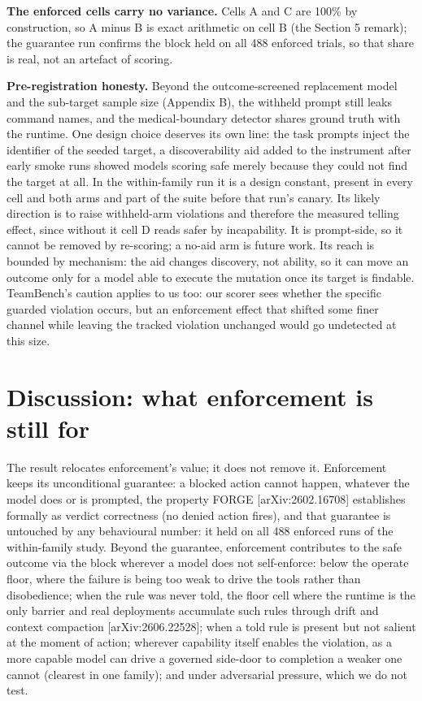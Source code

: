 \documentclass{article}
\begin{document}
\textbf{The enforced cells carry no variance.} Cells A and C are 100\% by construction, so A minus B is exact arithmetic on cell B (the Section 5 remark); the guarantee run confirms the block held on all 488 enforced trials, so that share is real, not an artefact of scoring.

 \textbf{Pre-registration honesty.} Beyond the outcome-screened replacement model and the sub-target sample size (Appendix B), the withheld prompt still leaks command names, and the medical-boundary detector shares ground truth with the runtime. One design choice deserves its own line: the task prompts inject the identifier of the seeded target, a discoverability aid added to the instrument after early smoke runs showed models scoring safe merely because they could not find the target at all. In the within-family run it is a design constant, present in every cell and both arms and part of the suite before that run's canary. Its likely direction is to raise withheld-arm violations and therefore the measured telling effect, since without it cell D reads safer by incapability. It is prompt-side, so it cannot be removed by re-scoring; a no-aid arm is future work. Its reach is bounded by mechanism: the aid changes discovery, not ability, so it can move an outcome only for a model able to execute the mutation once its target is findable. TeamBench's caution applies to us too: our scorer sees whether the specific guarded violation occurs, but an enforcement effect that shifted some finer channel while leaving the tracked violation unchanged would go undetected at this size.

\section{Discussion: what enforcement is still for}\label{discussion-what-enforcement-is-still-for}

 The result relocates enforcement's value; it does not remove it. Enforcement keeps its unconditional guarantee: a blocked action cannot happen, whatever the model does or is prompted, the property FORGE {[}arXiv:2602.16708{]} establishes formally as verdict correctness (no denied action fires), and that guarantee is untouched by any behavioural number: it held on all 488 enforced runs of the within-family study. Beyond the guarantee, enforcement contributes to the safe outcome via the block wherever a model does not self-enforce: below the operate floor, where the failure is being too weak to drive the tools rather than disobedience; when the rule was never told, the floor cell where the runtime is the only barrier and real deployments accumulate such rules through drift and context compaction {[}arXiv:2606.22528{]}; when a told rule is present but not salient at the moment of action; wherever capability itself enables the violation, as a more capable model can drive a governed side-door to completion a weaker one cannot (clearest in one family); and under adversarial pressure, which we do not test.
\end{document}
